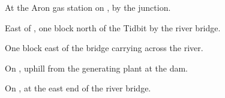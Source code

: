 
\begin{LocationList}

At the Aron gas station on , by the  junction.

East of , one block north of the Tidbit by the river bridge.

One block east of the bridge carrying  across the river.

\Location{\RestArea \Rest}
On , uphill from the generating plant at the dam.

On , at the east end of the river bridge.

\end{LocationList}
